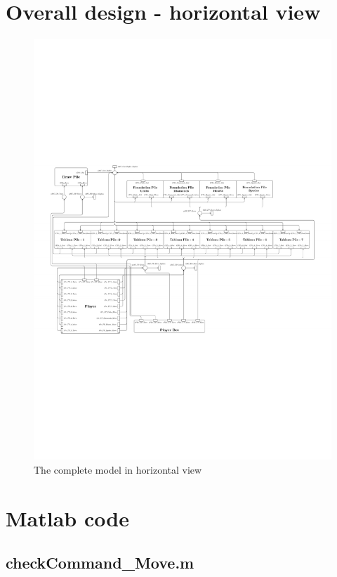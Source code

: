 \documentclass[runningheads,a4paper]{llncs}
\newcommand{\GPenSIM}{../GPenSIM}
\begin{document}
\section{Overall design - horizontal view}
\begin{figure}
	\label{fig:full_vertical}
	\includegraphics[trim=40 100 100 310,angle=90,scale=1.4]{images/overallViewPdf}
	\caption{The complete model in horizontal view}
\end{figure}
\clearpage
\section{Matlab code}	
\subsection{checkCommand\_Move.m}
\label{app:checkCommand_Move}

\end{document}
